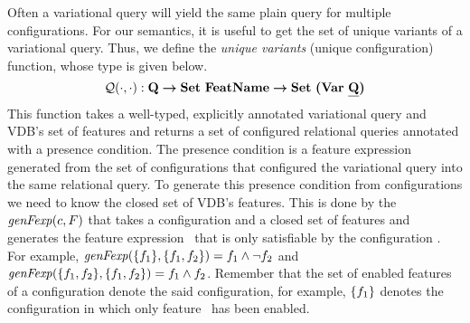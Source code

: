 


Often a variational query will yield the same plain query for multiple configurations.
For our semantics, it is useful to get the set of unique variants of a variational query.
Thus, we define the \emph{unique variants} (unique configuration) function, whose type is given below.
\[
\qGroup[\cdot]{\cdot} : \qSet \totype \settype \fSet \totype \settype {\bm{(} \vartype \pQSet \bm{)}}
\]
This function takes a well-typed, explicitly annotated variational query and VDB's set of features
and returns a set of configured relational queries annotated with
a presence condition. The presence condition is a feature expression generated from
the set of configurations that configured the variational query into the same relational query.
To generate this presence condition from configurations we need to know the closed 
set of VDB's features.
%
This is done by the $\mathit{genFexp} (\config,\features)$ that takes a configuration and a closed set of 
features and generates the feature expression \dimMeta\ that is only satisfiable by the configuration
\config. For example, $\mathit{genFexp} (\setDef {\A},\setDef {\A, \B}) = \A \wedge \neg \B$ and
$\mathit{genFexp} (\setDef {\A, \B},\setDef {\A, \B}) = \A \wedge \B$.
%
Remember that the set of enabled features of a configuration denote the said configuration,
for example, $\setDef {\A}$ denotes the configuration in which only feature \A\ has been 
enabled.

